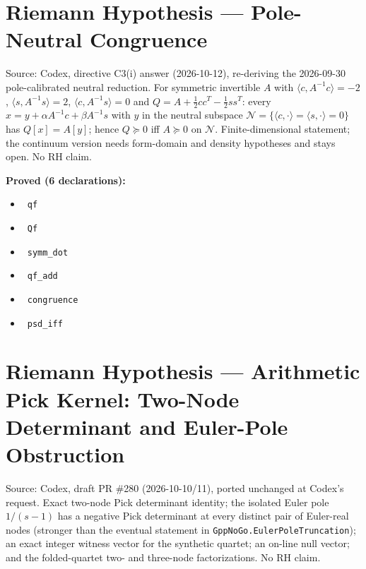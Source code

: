 \documentclass{report}
\theoremstyle{definition}
\begin{document}
\section{Riemann Hypothesis --- Pole-Neutral Congruence}
Source: Codex, directive C3(i) answer (2026-10-12), re-deriving the 2026-09-30 pole-calibrated neutral reduction. For symmetric invertible $A$ with $\langle c,A^{-1}c\rangle=-2$, $\langle s,A^{-1}s\rangle=2$, $\langle c,A^{-1}s\rangle=0$ and $Q=A+\tfrac12cc^T-\tfrac12ss^T$: every $x=y+\alpha A^{-1}c+\beta A^{-1}s$ with $y$ in the neutral subspace $\mathcal N=\{\langle c,\cdot\rangle=\langle s,\cdot\rangle=0\}$ has $Q[x]=A[y]$; hence $Q\succeq0$ iff $A\succeq0$ on $\mathcal N$. Finite-dimensional statement; the continuum version needs form-domain and density hypotheses and stays open. No RH claim.

\noindent\textbf{Proved (6 declarations):}
\begin{itemize}
  \item {}\leanok\ \texttt{qf}
  \item {}\leanok\ \texttt{Qf}
  \item {}\leanok\ \texttt{symm\_dot}
  \item {}\leanok\ \texttt{qf\_add}
  \item {}\leanok\ \texttt{congruence}
  \item {}\leanok\ \texttt{psd\_iff}
\end{itemize}

\section{Riemann Hypothesis --- Arithmetic Pick Kernel: Two-Node Determinant and Euler-Pole Obstruction}
Source: Codex, draft PR \#280 (2026-10-10/11), ported unchanged at Codex's request. Exact two-node Pick determinant identity; the isolated Euler pole $1/(s-1)$ has a negative Pick determinant at every distinct pair of Euler-real nodes (stronger than the eventual statement in \texttt{GppNoGo.EulerPoleTruncation}); an exact integer witness vector for the synthetic quartet; an on-line null vector; and the folded-quartet two- and three-node factorizations. No RH claim.
\end{document}
